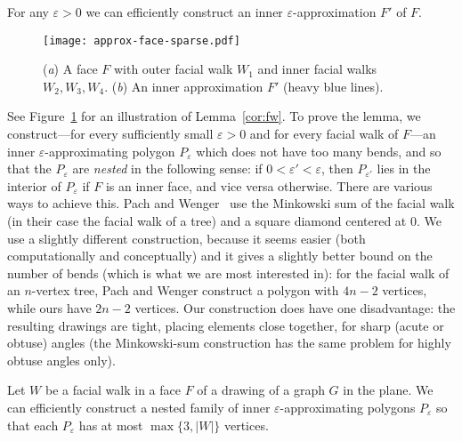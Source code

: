 \documentclass{llncs}
\begin{document}
\begin{lemma}\label{cor:fw}
For any $\varepsilon>0$ we can efficiently construct an inner $\varepsilon$-approximation $F'$ of $F$.
\end{lemma}

\begin{figure}[tb]
\centering
\texttt{[image: approx-face-sparse.pdf]}
\caption{(\emph{a}) A face $F$ with outer facial walk $W_1$ and inner facial walks $W_2, W_3, W_4$. (\emph{b}) An inner approximation $F'$ (heavy blue lines).}
\label{fig:approx}
\end{figure}

See Figure~\ref{fig:approx} for an illustration of Lemma~\ref{cor:fw}. To prove the lemma, we construct---for every sufficiently small $\varepsilon > 0$ and for every facial walk of $F$---an
inner ${\varepsilon}$-approximating polygon
$P_{\varepsilon}$ which
does not have too many bends, and so that the $P_{\varepsilon}$ are
{\em nested}
in the following sense: if $0 < \varepsilon' < \varepsilon$, then
$P_{\varepsilon'}$ lies in the interior of
$P_{\varepsilon}$ if $F$ is an inner face, and vice versa otherwise.
There are various ways to achieve this. Pach and Wenger~\cite{PW01} use the Minkowski sum of the facial walk (in their case the facial walk of a tree) and a square diamond centered at $0$.  We use a slightly different construction, because it seems easier (both computationally and conceptually) and it gives a slightly better bound on the number of bends (which is what we are most interested in): for the facial walk of an $n$-vertex tree, Pach and Wenger construct a
polygon with $4n-2$ vertices, while ours  have $2n-2$ vertices. Our construction does have one disadvantage: the resulting drawings are tight, placing elements close together, for sharp (acute or obtuse) angles (the Minkowski-sum construction has the same problem for highly obtuse angles only).

\begin{lemma}\label{lem:fw}
 Let $W$ be a facial walk in a face $F$ of a drawing of a graph $G$ in the plane. We can efficiently construct a
 nested family of inner ${\varepsilon}$-approximating polygons
$P_{\varepsilon}$ so that
each $P_{\varepsilon}$ has at most $\max\{3,|W|\}$ vertices.
\end{lemma}
\end{document}
